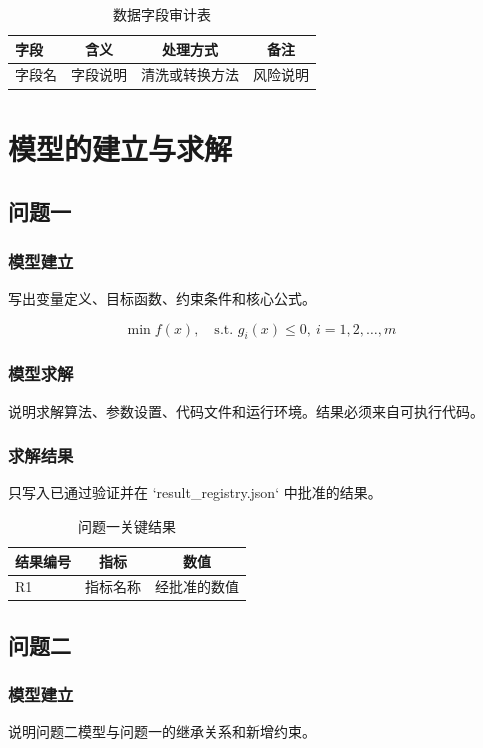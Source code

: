 \documentclass[UTF8,a4paper,12pt]{ctexart}
\begin{document}
\begin{table}[H]
\centering
\caption{数据字段审计表}
\begin{tabularx}{\textwidth}{LCCC}
\toprule
字段 & 含义 & 处理方式 & 备注 \\
\midrule
字段名 & 字段说明 & 清洗或转换方法 & 风险说明 \\
\bottomrule
\end{tabularx}
\label{tab:data-audit}
\end{table}

\section{模型的建立与求解}
\subsection{问题一}
\subsubsection{模型建立}
写出变量定义、目标函数、约束条件和核心公式。

\[
  \min f(x), \quad \text{s.t. } g_i(x) \le 0,\ i=1,2,\dots,m
\]

\subsubsection{模型求解}
说明求解算法、参数设置、代码文件和运行环境。结果必须来自可执行代码。

\subsubsection{求解结果}
只写入已通过验证并在 `result_registry.json` 中批准的结果。

\begin{table}[H]
\centering
\caption{问题一关键结果}
\begin{tabularx}{\textwidth}{LCC}
\toprule
结果编号 & 指标 & 数值 \\
\midrule
R1 & 指标名称 & 经批准的数值 \\
\bottomrule
\end{tabularx}
\label{tab:q1-results}
\end{table}

\subsection{问题二}
\subsubsection{模型建立}
说明问题二模型与问题一的继承关系和新增约束。
\end{document}
